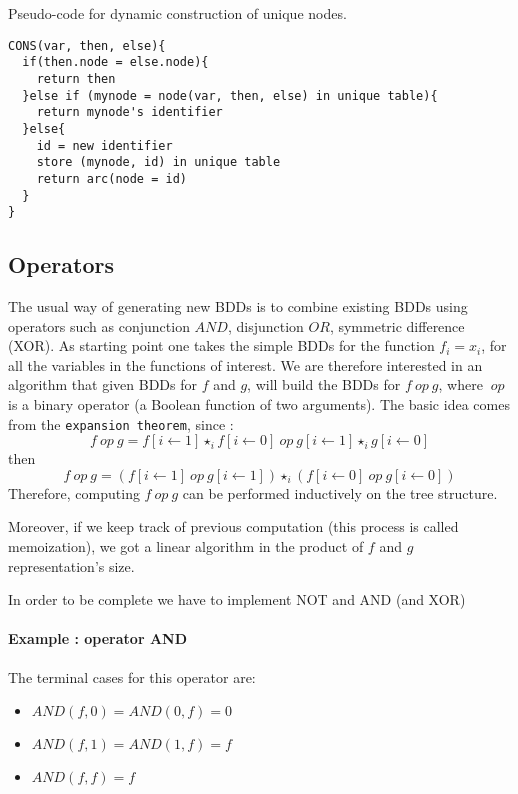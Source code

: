 \documentclass[a4paper,10pt]{article}
\begin{document}
Pseudo-code for dynamic construction of unique nodes.

\begin{lstlisting}
CONS(var, then, else){
  if(then.node = else.node){
    return then
  }else if (mynode = node(var, then, else) in unique table){
    return mynode's identifier
  }else{
    id = new identifier
    store (mynode, id) in unique table
    return arc(node = id)
  }
}
\end{lstlisting}


\subsection{Operators}

\newcommand{\op}{~op~}

The usual way of generating new BDDs is to combine existing BDDs using operators such as conjunction $AND$, disjunction $OR$, symmetric difference (XOR).
As starting point one takes the simple BDDs for the function $f_i = x_i$, for all the variables in the functions of interest.
We are therefore interested in an algorithm that given BDDs for $f$ and $g$, will build the BDDs for $f\op g$, where $\op$ is a binary operator (a Boolean function of two arguments). The basic idea comes from the \texttt{expansion theorem}, since :
\[f\op g = f[i\leftarrow 1]\star_i f[i\leftarrow 0] \op g[i\leftarrow 1]\star_i g[i\leftarrow 0]\]
then
\[f\op g = (f[i\leftarrow 1]\op g[i\leftarrow 1])\star_i(f[i\leftarrow 0] \op g[i\leftarrow 0])\]
Therefore, computing $f\op g$ can be performed inductively on the tree structure.

Moreover, if we keep track of previous computation (this process is called memoization), we got a linear algorithm in the product of $f$ and $g$ representation's size.

In order to be complete we have to implement NOT and AND (and XOR)

\paragraph{Example : operator AND\\}
The terminal cases for this operator are:\begin{itemize}
\item $AND(f, 0) = AND(0, f) = 0$
\item $AND(f, 1) = AND(1, f) = f$
\item $AND(f, f) = f$
\end{itemize}
\end{document}
